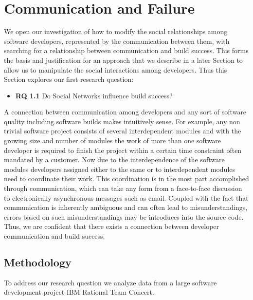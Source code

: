 \section{Communication and Failure}
\label{chap:soc-net}
We open our investigation of how to modify the social relationships among software developers, represented by the communication between them, with searching for a relationship between communication and build success.
This forms the basis and justification for an approach that we describe in a later Section to allow us to manipulate the social interactions among developers.
Thus this Section explores our first research question:
\begin{itemize}
\item\textbf{RQ 1.1} Do Social Networks influence build success?
\end{itemize}

A connection between communication among developers and any sort of software quality including software builds makes intuitively sense.
For example, any non trivial software project consists of several interdependent modules and with the growing size and number of modules the work of more than one software developer is required to finish the project within a certain time constraint often mandated by a customer.
Now due to the interdependence of the software modules developers assigned either to the same or to interdependent modules need to coordinate their work.
This coordination is in the most part accomplished through communication, which can take any form from a face-to-face discussion to electronically asynchronous messages such as email.
Coupled with the fact that communication is inherently ambiguous and can often lead to misunderstandings, errors based on such misunderstandings may be introduces into the source code.
Thus, we are confident that there exists  a connection between developer communication and build success.



\subsection{Methodology}
\label{sec:Methodology}
To address our research question we analyze data from a large software
development project IBM Rational Team Concert.

